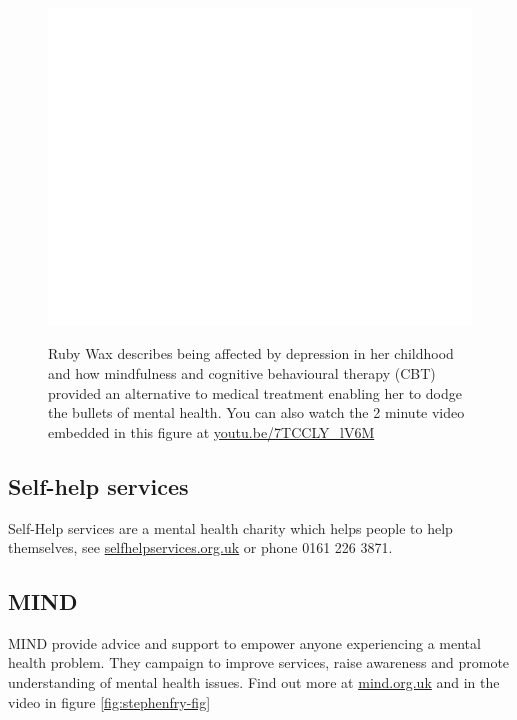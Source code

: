 \documentclass[
]{book}
\begin{document}
\begin{figure}

{\centering \href{https://www.youtube.com/embed/7TCCLY_lV6M}{\includegraphics[width=0.99\linewidth]{cdyf_files/figure-latex/rubywax-fig-1} }

}

\caption{Ruby Wax describes being affected by depression in her childhood and how mindfulness and cognitive behavioural therapy (CBT) provided an alternative to medical treatment enabling her to dodge the bullets of mental health. You can also watch the 2 minute video embedded in this figure at \href{https://youtu.be/7TCCLY_lV6M}{youtu.be/7TCCLY\_lV6M} \citep{youtube-wax}}\label{fig:rubywax-fig}
\end{figure}



\hypertarget{selfhelp}{%
\subsection{Self-help services}\label{selfhelp}}

Self-Help services are a mental health charity which helps people to help themselves, see \href{https://www.selfhelpservices.org.uk/}{selfhelpservices.org.uk} or phone 0161 226 3871.

\hypertarget{mindhelp}{%
\subsection{MIND}\label{mindhelp}}

MIND provide advice and support to empower anyone experiencing a mental health problem. They campaign to improve services, raise awareness and promote understanding of mental health issues. Find out more at \href{https://www.mind.org.uk}{mind.org.uk} and in the video in figure \ref{fig:stephenfry-fig}
\end{document}

